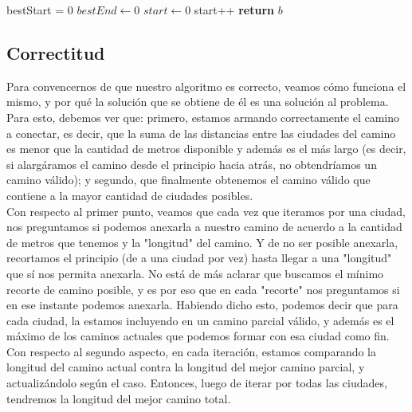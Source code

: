 \documentclass{article}
\theoremstyle{definition}
\theoremstyle{remark}
\begin{document}
\begin{algorithmic}[1]
\State bestStart = 0
\State $bestEnd\gets 0$
\State $start\gets 0$
\State start++
\EndWhile\label{euclidendwhile}
\EndIf
{}
\EndFor
\State \textbf{return} $b$
\EndProcedure
\end{algorithmic}


\subsection{Correctitud}
Para convencernos de que nuestro algoritmo es correcto, veamos cómo funciona el mismo, y por qué la solución que se obtiene de él es una solución al problema. \\ 
Para esto, debemos ver que: primero, estamos armando correctamente el camino a conectar, es decir, que la suma de las distancias entre las ciudades del camino es menor que la cantidad de metros disponible y además es el más largo (es decir, si alargáramos el camino desde el principio hacia atrás, no obtendríamos un camino válido); y segundo, que finalmente obtenemos el camino válido que contiene a la mayor cantidad de ciudades posibles. \\
Con respecto al primer punto, veamos que cada vez que iteramos por una ciudad, nos preguntamos si podemos anexarla a nuestro camino de acuerdo a la cantidad de metros que tenemos y la "longitud" del camino. Y de no ser posible anexarla, recortamos el principio (de a una ciudad por vez) hasta llegar a una "longitud" que sí nos permita anexarla. No está de más aclarar que buscamos el mínimo recorte de camino posible, y es por eso que en cada "recorte" nos preguntamos si en ese instante podemos anexarla. Habiendo dicho esto, podemos decir que para cada ciudad, la estamos incluyendo en un camino parcial válido, y además es el máximo de los caminos actuales que podemos formar con esa ciudad como fin. \\

Con respecto al segundo aspecto, en cada iteración, estamos comparando la longitud del camino actual contra la longitud del mejor camino parcial, y actualizándolo según el caso. Entonces, luego de iterar por todas las ciudades, tendremos la longitud del mejor camino total. \\
\end{document}
